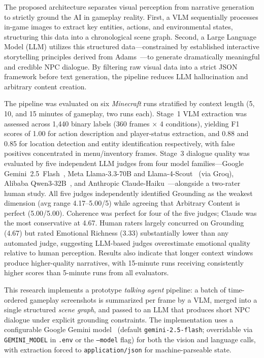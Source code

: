 \documentclass{article}
\begin{document}
The proposed architecture separates visual perception from narrative generation to strictly ground the AI in gameplay reality. First, a VLM sequentially processes in-game images to extract key entities, actions, and environmental states, structuring this data into a chronological scene graph. Second, a Large Language Model (LLM) utilizes this structured data---constrained by established interactive storytelling principles derived from Adams~\cite{Adams2014}---to generate dramatically meaningful and credible NPC dialogue. By filtering raw visual data into a strict JSON framework before text generation, the pipeline reduces LLM hallucination and arbitrary content creation.

The pipeline was evaluated on six \emph{Minecraft} runs stratified by context length (5, 10, and 15 minutes of gameplay, two runs each). Stage~1 VLM extraction was assessed across 1{,}440 binary labels (360 frames $\times$ 4 conditions), yielding F1 scores of 1.00 for action description and player-status extraction, and 0.88 and 0.85 for location detection and entity identification respectively, with false positives concentrated in menu/inventory frames. Stage~3 dialogue quality was evaluated by five independent LLM judges from four model families---Google Gemini~2.5~Flash~\cite{GeminiTeam2024b}, Meta Llama-3.3-70B and Llama-4-Scout~\cite{Dubey2024} (via Groq), Alibaba Qwen3-32B~\cite{QwenTeam2025}, and Anthropic Claude-Haiku~\cite{AnthropicClaude2024}---alongside a two-rater human study. All five judges independently identified Grounding as the weakest dimension (avg range 4.17--5.00/5) while agreeing that Arbitrary Content is perfect (5.00/5.00). Coherence was perfect for four of the five judges; Claude was the most conservative at 4.67. Human raters largely concurred on Grounding (4.67) but rated Emotional Richness (3.33) substantially lower than any automated judge, suggesting LLM-based judges overestimate emotional quality relative to human perception. Results also indicate that longer context windows produce higher-quality narratives, with 15-minute runs receiving consistently higher scores than 5-minute runs from all evaluators.

This research implements a prototype \emph{talking agent} pipeline: a batch of time-ordered gameplay screenshots is summarized per frame by a VLM, merged into a single structured \emph{scene graph}, and passed to an LLM that produces short NPC dialogue under explicit grounding constraints. The implementation uses a configurable Google Gemini model~\cite{GeminiTeam2024b} (default \texttt{gemini-2.5-flash}; overridable via \texttt{GEMINI\_MODEL} in \texttt{.env} or the \texttt{--model} flag) for both the vision and language calls, with extraction forced to \texttt{application/json} for machine-parseable state.
\end{document}
